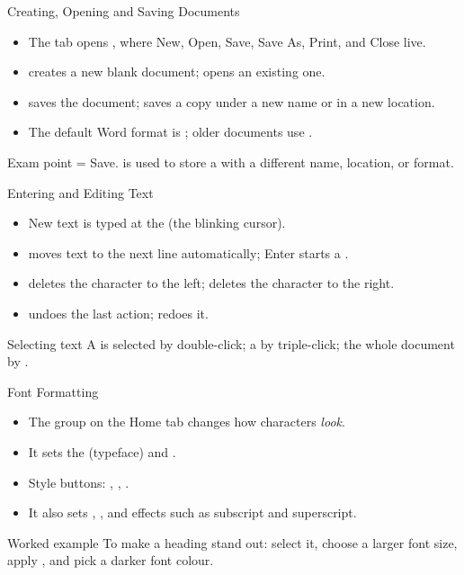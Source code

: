 \documentclass[aspectratio=169]{beamer}
\begin{document}
\begin{frame}{Creating, Opening and Saving Documents}
  \begin{itemize}
    \item The  tab opens , where New, Open,
      Save, Save As, Print, and Close live.
    \item {} creates a new blank document;  opens an
      existing one.
    \item {} saves the document;  saves a copy under a
      new name or in a new location.
    \item The default Word format is ; older documents use
      .
  \end{itemize}
  \begin{alertblock}{Exam point}
     = Save.  is used to store a  with a
    different name, location, or format.
  \end{alertblock}
\end{frame}

\begin{frame}{Entering and Editing Text}
  \begin{itemize}
    \item New text is typed at the  (the blinking
      cursor).
    \item {} moves text to the next line automatically; Enter
      starts a .
    \item {} deletes the character to the left; 
      deletes the character to the right.
    \item {} undoes the last action;  redoes it.
  \end{itemize}
  \begin{block}{Selecting text}
    A  is selected by double-click; a  by
    triple-click; the whole document by .
  \end{block}
\end{frame}

\begin{frame}{Font Formatting}
  \begin{itemize}
    \item The  group on the Home tab changes how characters
      \emph{look}.
    \item It sets the  (typeface) and .
    \item Style buttons: , ,
      .
    \item It also sets , , and effects such
      as subscript and superscript.
  \end{itemize}
  \begin{exampleblock}{Worked example}
    To make a heading stand out: select it, choose a larger font size, apply
    , and pick a darker font colour.
  \end{exampleblock}
\end{frame}
\end{document}

